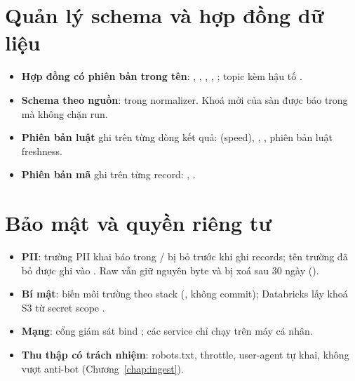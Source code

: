 \section{Quản lý schema và hợp đồng dữ liệu}
\begin{itemize}
  \item \textbf{Hợp đồng có phiên bản trong tên}: , , ,
        , ; topic kèm hậu tố .
  \item \textbf{Schema theo nguồn}:  trong normalizer. Khoá mới của sàn được báo trong  mà không chặn run.
  \item \textbf{Phiên bản luật} ghi trên từng dòng kết quả:  (speed), , , phiên bản luật freshness.
  \item \textbf{Phiên bản mã} ghi trên từng record: , .
\end{itemize}

\section{Bảo mật và quyền riêng tư}
\begin{itemize}
  \item \textbf{PII}: trường PII khai báo trong / bị bỏ trước khi ghi records; tên trường đã bỏ được ghi vào .
        Raw vẫn giữ nguyên byte và bị xoá sau 30 ngày ().
  \item \textbf{Bí mật}: biến môi trường theo stack (, không commit); Databricks lấy khoá S3 từ secret scope .
  \item \textbf{Mạng}: cổng giám sát bind ; các service chỉ chạy trên máy cá nhân.
  \item \textbf{Thu thập có trách nhiệm}: robots.txt, throttle, user-agent tự khai, không vượt anti-bot (Chương~\ref{chap:ingest}).
\end{itemize}
